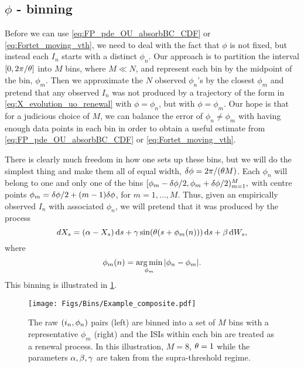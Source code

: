 \subsection{$\phi$ - binning}
Before we can use \cref{eq:FP_pde_OU_absorbBC_CDF} or
\eqref{eq:Fortet_moving_vth}, we need to deal with the fact that $\phi$ is not
fixed, but instead each $I_n$ starts with a distinct $\phi_n$. Our approach is
to partition the interval $[0, 2 \pi/{ \theta}]$ into $M$ bins, where $M \ll N$, and
represent each bin by the midpoint of the bin, $\phi_m$. Then we approximate the
$N$ observed $\phi_n$'s by the closest $\phi_m$ and pretend that any observed
$I_n$ was not produced by a trajectory of the form in
\cref{eq:X_evolution_uo_renewal} with $\phi = \phi_n$, but with $\phi = \phi_m$.
Our hope is that for a judicious choice of $M$, we can balance the error of
$\phi_n \neq \phi_m$ with having enough data points in each bin in order to
obtain a useful estimate from \cref{eq:FP_pde_OU_absorbBC_CDF} or
\eqref{eq:Fortet_moving_vth}.

There is clearly much freedom in how one sets up these bins, but we will do the
simplest thing and make them all of equal width, ${ \delta \phi } = 2 \pi / {({ \theta} M)}$.
Each $\phi_n$ will belong to one and only one of the bins $ [\phi_m - { \delta \phi }/2,
\phi_m + { \delta \phi }/2)_{m=1}^M, $ with centre points $ \phi_m = { \delta \phi } / 2 + (m-1)
{ \delta \phi }$, for $m = 1,\ldots, M$. Thus, given an empirically observed $I_n$ with
associated $\phi_n$, we will pretend that it was produced by the process $$ dX_s
= (\alpha - X_s) \, \mathrm{d} s  + {\gamma } \sin({ \theta} (s+\phi_m(n) ))
\, \mathrm{d} s
+ \beta \, \mathrm{d} W_s, $$ where $$ \phi_m(n)  = \argmin_{\phi_m} {| \phi_n - \phi_m|}.
$$ This binning is illustrated in \cref{fig:binning_visualized}.
\begin{figure}[ht]
\begin{center}
\texttt{[image: Figs/Bins/Example\_composite.pdf]}
  \end{center}
\caption[Phase binning illustration]{The raw $({ i_n}, \phi_n)$ pairs (left) are
binned into a set of $M$ bins with a representative $\phi_m$ (right) and the ISIs within each bin are treated
as a renewal process. In this illustration, $M=8$, ${ \theta} =
1$ while the parameters ${\alpha,\beta,{\gamma } }$ are taken from the
supra-threshold regime. }
\label{fig:binning_visualized} 
\end{figure}

